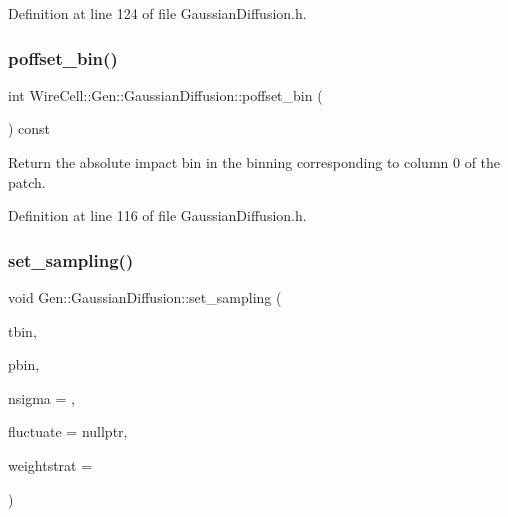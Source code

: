 Definition at line 124 of file Gaussian\+Diffusion.\+h.

\mbox{\label{class_wire_cell_1_1_gen_1_1_gaussian_diffusion_ae818d9a49c5d073cad70869dfed232f2}} 
\subsubsection{\texorpdfstring{poffset\+\_\+bin()}{poffset\_bin()}}
{\footnotesize\ttfamily int Wire\+Cell\+::\+Gen\+::\+Gaussian\+Diffusion\+::poffset\+\_\+bin (\begin{DoxyParamCaption}{ }\end{DoxyParamCaption}) const\hspace{0.3cm}{\ttfamily [inline]}}



Return the absolute impact bin in the binning corresponding to column 0 of the patch. 



Definition at line 116 of file Gaussian\+Diffusion.\+h.

\mbox{\label{class_wire_cell_1_1_gen_1_1_gaussian_diffusion_aee13d3eff7f4d5b15d2bffd7b982fae4}} 
\subsubsection{\texorpdfstring{set\+\_\+sampling()}{set\_sampling()}}
{\footnotesize\ttfamily void Gen\+::\+Gaussian\+Diffusion\+::set\+\_\+sampling (\begin{DoxyParamCaption}\item[{const \hyperlink{class_wire_cell_1_1_binning}{Binning} \&}]{tbin,  }\item[{const \hyperlink{class_wire_cell_1_1_binning}{Binning} \&}]{pbin,  }\item[{double}]{nsigma = {},  }\item[{\hyperlink{class_wire_cell_1_1_interface_a09c548fb8266cfa39afb2e74a4615c37}{I\+Random\+::pointer}}]{fluctuate = {\ttfamily nullptr},  }\item[{unsigned int}]{weightstrat = {} }\end{DoxyParamCaption})}

